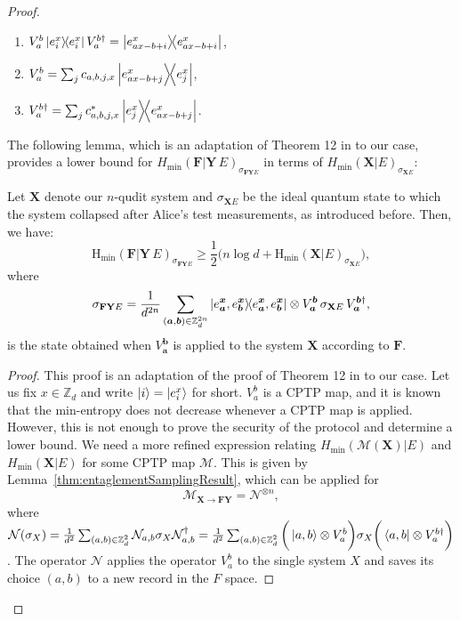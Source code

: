 \begin{proof}
\begin{enumerate}%
    \item $V^b_a \ketbra{e^x_i} V^{b \dagger}_a = \ketbra{e^x_{ax - b + i}}$, \label{prop:a}
    \item $V^b_a = \sum_j c_{a,b,j,x} \ketbra{e^x_{ax - b + j}}{e^x_j}$,\label{prop:b}
    \item $V^{b\dagger}_a = \sum_j c_{a,b,j,x}^* \ketbra{e^x_j}{e^x_{ax - b + j}}$.\label{prop:c}
\end{enumerate}
The following lemma,  which is an adaptation of Theorem 12 in \cite{Dupuis2015} to our case, provides a lower bound for $H_\text{min}(\mathbf{F}|\mathbf{Y}\, E)_{\sigma_{\mathbf{F}\mathbf{Y} E}}$ in terms of $H_{\text{min}}(\mathbf{X} |E)_{\sigma_{\mathbf{X}E}}$:
\begin{lemma} 
\label{lem:GnBound}
Let $\mathbf{X}$ denote our $n$-qudit system and $\sigma_{\mathbf{X} E}$ be the ideal quantum state to which the system collapsed after Alice's test measurements, as introduced before. Then, we have:
\begin{equation*}
    \text{H}_\text{min}(\mathbf{F}|\mathbf{Y}\, E)_{\sigma_{\mathbf{F}\mathbf{Y} E}} \geq \frac{1}{2} \big(n\log d + \text{H}_\text{min}(\mathbf{X}| E)_{\sigma_{\mathbf{X} E}}\big),
\end{equation*}
where 
\begin{equation}
    \sigma_{\mathbf{F}\mathbf{Y} E} = \frac{1}{d^{2n}} \sum_{(\bm{a}, \bm{b}) \in \mathbb{Z}^{2n}_d} \ketbra{e^{\bm{x}}_{\bm{a}},e^{\bm{x}}_{\bm{b}}}\otimes V^{\bm{b}}_{\bm{a}} \, \sigma_{\mathbf{X} E}\,  V^{\bm{b}\dagger}_{\bm{a}},
    \label{eq:VappliedX}
\end{equation}
is the state obtained when $V^{\bm{b}}_{\bm{a}}$ is applied to the system $\mathbf{X}$ according to $\mathbf{F}$. 
\end{lemma}

\begin{proof}
This proof is an adaptation of the proof of Theorem 12 in \cite{Dupuis2015} to our case.
Let us fix $x\in\mathbb{Z}_d$ and write $\ket{i} = \ket{e^x_i}$  for short. 
 $V^b_a$ is a CPTP map, and it is known that the min-entropy does not decrease whenever a CPTP map is applied. However, this is not enough  to prove the security of the protocol and determine a lower bound. We need a more refined expression relating  $H_{\min}(\mathcal{M}(\mathbf{X})|E)$ and  $H_{\min}(\mathbf{X}|E)$ for some CPTP map $\mathcal{M}$. This is given by Lemma~\ref{thm:entaglementSamplingResult}, which can be applied for $$\mathcal{M}_{\mathbf{X}\rightarrow \mathbf{F}\mathbf{Y}} = \mathcal{N}^{\otimes n},$$ where $\mathcal{N}(\sigma_X) = \frac{1}{d^2}\sum_{(a,b)\in\mathbb{Z}^2_d}\mathcal{N}_{a,b} \sigma_X \mathcal{N}_{a,b}^\dagger = \frac{1}{d^2} \sum_{(a,b)\in\mathbb{Z}^2_d} \bigg( \ket{a,b} \otimes V^b_a \bigg) \sigma_X \bigg( \bra{a,b} \otimes V^{b\dagger}_a \bigg) $. The operator $\mathcal{N}$ applies the operator $V^b_a$ to the single system $X$ and saves its choice $(a,b)$ to a new record in the  $F$ space.  


\end{proof}
\end{proof}
